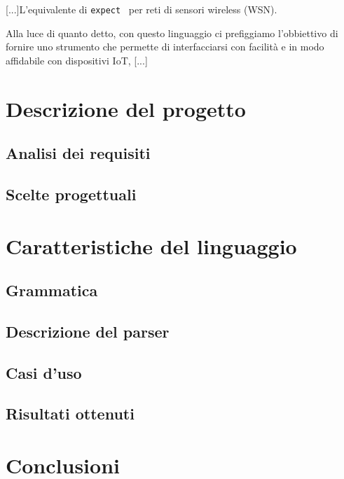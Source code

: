 \documentclass[]{article}
\begin{document}
[...]L'equivalente di \texttt{expect}~\cite{libes1991expect, libes1990expect} per reti di sensori wireless (WSN).

Alla luce di quanto detto, con questo linguaggio ci prefiggiamo l'obbiettivo di fornire uno strumento che permette di interfacciarsi con facilità e in modo affidabile con dispositivi IoT, [...]

\section{Descrizione del progetto}\label{section:descrizione}
\subsection{Analisi dei requisiti}
\subsection{Scelte progettuali}
\section{Caratteristiche del linguaggio}\label{section:caratteristiche-linguaggio}
\subsection{Grammatica}
\subsection{Descrizione del parser}
\subsection{Casi d'uso}\label{subsection:casi-d_uso}
\subsection{Risultati ottenuti}\label{subsection:risultati}
\section{Conclusioni}\label{section:conclusioni}






\end{document}
